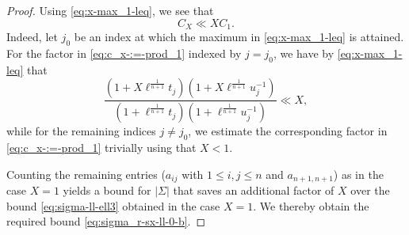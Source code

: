 \documentclass[reqno]{amsart}
\theoremstyle{plain} \newtheorem{theorem} {Theorem}
\theoremstyle{definition} \newtheorem{definition} [theorem] {Definition}
\theoremstyle{itplain} %
\numberwithin{equation}{section}
\numberwithin{theorem}{section}
\renewcommand{\leq}{\leqslant}
\begin{document}
\begin{proof}
  Using \eqref{eq:x-max_1-leq},  we see that
  \begin{equation}\label{eq:c_x-ll-x}
    C_X \ll X  C_1.
  \end{equation}
  Indeed, let $j_0$ be an index at which the maximum in \eqref{eq:x-max_1-leq} is attained.  For the factor in \eqref{eq:c_x-:=-prod_1} indexed by $j = j_0$, we have by \eqref{eq:x-max_1-leq} that
  \begin{equation*}
    \frac{
      (1 + X \ell^{\frac{1}{n+1}} t_j)  (1 + X \ell^{\frac{1}{n+1}} u_j^{-1})
    }{
      (1 + \ell^{\frac{1}{n+1}} t_j)  (1 + \ell^{\frac{1}{n+1}} u_j^{-1})
    }
    \ll X,
  \end{equation*}
  while for the remaining indices $j \neq j_0$, we estimate the corresponding factor in \eqref{eq:c_x-:=-prod_1} trivially using that $X < 1$.

  Counting the remaining entries ($a_{i j}$ with $1 \leq i, j \leq n$ and $a_{n+1,n+1}$) as in the case $X = 1$ yields a bound for $|\Sigma|$ that saves an additional factor of $X$ over the bound \eqref{eq:sigma-ll-ell3} obtained in the case $X = 1$.  We thereby obtain the required bound \eqref{eq:sigma_r-sx-ll-0-b}.
\end{proof}
\end{document}
